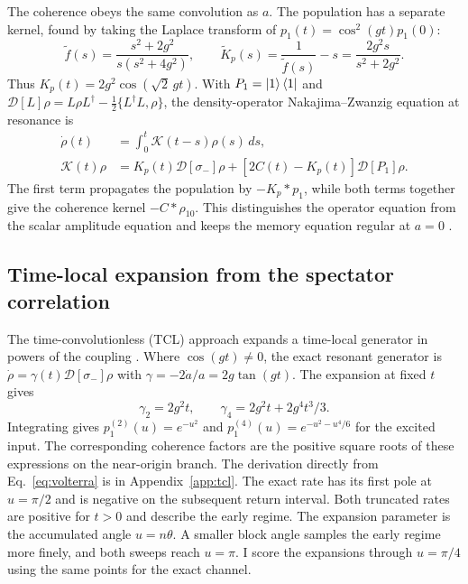 \documentclass[
    pra,
    showpacs,
    groupedaddress,
    notitlepage,
    floatfix,
    nofootinbib
]{revtex4-2}
\newcommand{\Diss}{\mathcal{D}}
\begin{document}
The coherence obeys the same convolution as $a$. The population has a separate kernel, found by taking the Laplace transform of 
$p_1(t)=\cos^2(gt)p_1(0)$:
\begin{equation}
 \widetilde f(s)=\frac{s^2+2g^2}{s(s^2+4g^2)},\qquad
 \widetilde K_p(s)=\frac{1}{\widetilde f(s)}-s
                 =\frac{2g^2s}{s^2+2g^2}.
\end{equation}
Thus $K_p(t)=2g^2\cos(\sqrt2\,gt)$. With $P_1=\ket1\bra1$ and $\Diss[L]\rho=L\rho L^\dagger-\frac12\{L^\dagger L,\rho\}$, 
the density-operator Nakajima--Zwanzig equation at resonance is
\begin{align}
 \dot\rho(t)&=\int_0^t \mathcal K(t-s)\rho(s)\,ds,\nonumber\\
 \mathcal K(t)\rho&=K_p(t)\Diss[\sigma_-]\rho
                   +[2C(t)-K_p(t)]\Diss[P_1]\rho.
 \label{eq:nz}
\end{align}
The first term propagates the population by $-K_p*p_1$, while both terms together give the coherence kernel $-C*\rho_{10}$. 
This distinguishes the operator equation from the scalar amplitude equation and keeps the memory equation regular at $a=0$ \cite{vacchini}.

\subsection{Time-local expansion from the spectator correlation}
The time-convolutionless (TCL) approach expands a time-local generator in powers of the coupling \cite{breuer,lidar}. Where $\cos(gt)\ne0$, 
the exact resonant generator is $\dot\rho=\gamma(t)\Diss[\sigma_-]\rho$ with $\gamma=-2\dot a/a=2g\tan(gt)$. The expansion at fixed $t$ gives
\begin{equation}
 \gamma_2=2g^2t,\qquad \gamma_4=2g^2t+2g^4t^3/3.
 \label{eq:rates}
\end{equation}
Integrating gives $p_1^{(2)}(u)=e^{-u^2}$ and $p_1^{(4)}(u)=e^{-u^2-u^4/6}$ for the excited input. The corresponding coherence factors are 
the positive square roots of these expressions on the near-origin branch. The derivation directly from Eq.~\eqref{eq:volterra} is in 
Appendix~\ref{app:tcl}. The exact rate has its first pole at $u=\pi/2$ and is negative on the subsequent return interval. Both truncated 
rates are positive for $t>0$ and describe the early regime. The expansion parameter is the accumulated angle $u=n\theta$. A smaller block angle
samples the early regime more finely, and both sweeps reach $u=\pi$. I score the expansions through $u=\pi/4$ using the same points for the exact channel.
\end{document}
